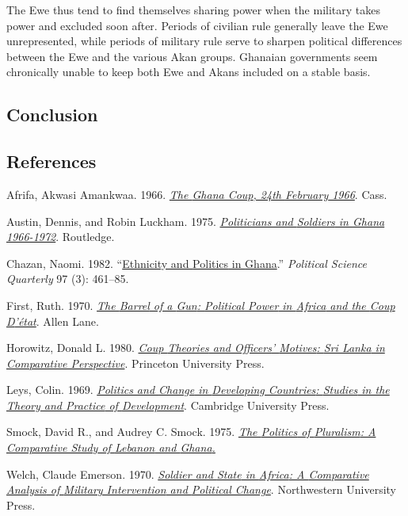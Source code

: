 \documentclass[
  letterpaper,
  DIV=11,
  numbers=noendperiod]{scrartcl}
\newlength{\cslhangindent}
\newenvironment{CSLReferences}[2] %
 {\begin{list}{}{%
  \setlength{\itemindent}{0pt}
  \setlength{\leftmargin}{0pt}
  \setlength{\parsep}{0pt}
  \ifodd #1
   \setlength{\leftmargin}{\cslhangindent}
   \setlength{\itemindent}{-1\cslhangindent}
  \fi
  \setlength{\itemsep}{#2\baselineskip}}}
 {\end{list}}
\begin{document}
The Ewe thus tend to find themselves sharing power when the military
takes power and excluded soon after. Periods of civilian rule generally
leave the Ewe unrepresented, while periods of military rule serve to
sharpen political differences between the Ewe and the various Akan
groups. Ghanaian governments seem chronically unable to keep both Ewe
and Akans included on a stable basis.

\subsection{Conclusion}\label{conclusion}

\subsection{References}\label{references}

\protect{}\label{refs}
\begin{CSLReferences}{1}{0}
Afrifa, Akwasi Amankwaa. 1966.
\emph{\href{https://books.google.com?id=5IQhAAAAMAAJ}{The {Ghana Coup},
24th {February} 1966}}. Cass.

Austin, Dennis, and Robin Luckham. 1975.
\emph{\href{https://books.google.com?id=oa3rAgAAQBAJ}{Politicians and
{Soldiers} in {Ghana} 1966-1972}}. Routledge.

Chazan, Naomi. 1982. {``\href{https://doi.org/10.2307/2149995}{Ethnicity
and {Politics} in {Ghana}}.''} \emph{Political Science Quarterly} 97
(3): 461--85.

First, Ruth. 1970.
\emph{\href{https://books.google.com?id=8P0EAQAAIAAJ}{The {Barrel} of a
{Gun}: {Political Power} in {Africa} and the {Coup D}'état}}. Allen
Lane.

Horowitz, Donald L. 1980.
\emph{\href{https://books.google.com?id=ZbP_AwAAQBAJ}{Coup {Theories}
and {Officers}' {Motives}: {Sri Lanka} in {Comparative Perspective}}}.
Princeton University Press.

Leys, Colin. 1969.
\emph{\href{https://books.google.com?id=FkcJbkpXufYC}{Politics and
{Change} in {Developing Countries}: {Studies} in the {Theory} and
{Practice} of {Development}}}. Cambridge University Press.

Smock, David R., and Audrey C. Smock. 1975.
\emph{\href{https://doi.org/10.2307/2064848}{The {Politics} of
{Pluralism}: {A Comparative Study} of {Lebanon} and {Ghana}.}}

Welch, Claude Emerson. 1970.
\emph{\href{https://books.google.com?id=xAC5AAAAIAAJ}{Soldier and
{State} in {Africa}: A {Comparative Analysis} of {Military Intervention}
and {Political Change}}}. Northwestern University Press.

\end{CSLReferences}
\end{document}
